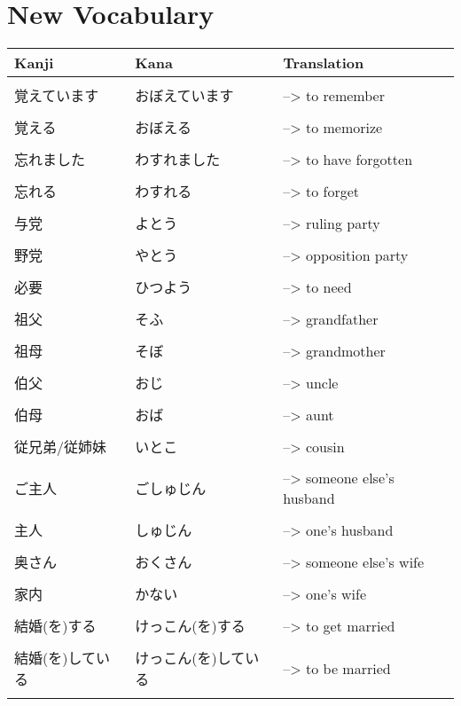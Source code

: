 \documentclass{article}
\begin{document}
\part*{New Vocabulary}
\begin{tabular}{ l | l l }
Kanji&Kana&Translation\\ \hline\\[-1em]
覚えています&おぼえています&--> to remember \\ \hline\\[-1em]
覚える &おぼえる&--> to memorize \\ \hline\\[-1em]
忘れました &わすれました&--> to have forgotten \\ \hline\\[-1em]
忘れる &わすれる&--> to forget \\ \hline\\[-1em]
与党 &よとう&--> ruling party \\ \hline\\[-1em]
野党 &やとう&--> opposition party \\ \hline\\[-1em]
必要&ひつよう&--> to need \\ \hline\\[-1em]
祖父&そふ&--> grandfather \\ \hline\\[-1em]
祖母&そぼ&--> grandmother \\ \hline\\[-1em]
伯父&おじ&--> uncle \\ \hline\\[-1em]
伯母&おば&--> aunt \\ \hline\\[-1em]
従兄弟/従姉妹&いとこ&--> cousin \\ \hline\\[-1em]
ご主人&ごしゅじん&--> someone else's husband \\ \hline\\[-1em]
主人&しゅじん&--> one's husband \\ \hline\\[-1em]
奥さん&おくさん&--> someone else's wife \\ \hline\\[-1em]
家内&かない&--> one's wife \\ \hline\\[-1em]
結婚(を)する&けっこん(を)する&--> to get married \\ \hline\\[-1em]
結婚(を)している&けっこん(を)している&--> to be married \\ \hline\\[-1em]

\end{tabular}
\end{document}
